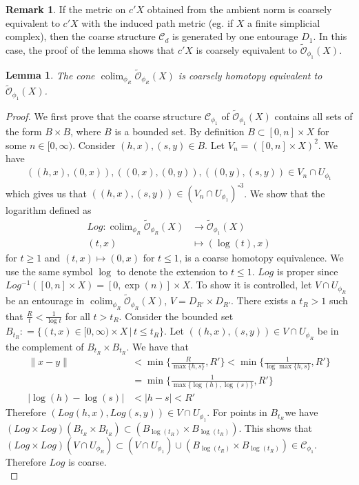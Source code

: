\documentclass[a4paper,11pt]{article}
\theoremstyle{definition}
\newtheorem*{remark}{Remark}
\theoremstyle{plain}
\newtheorem{lemma}[definition]{Lemma}
\theoremstyle{remark}
\DeclareMathOperator{\colim}{colim}
\begin{document}
\begin{remark} If the metric on $c'X$ obtained from the ambient norm is coarsely equivalent to $c'X$ with the induced path metric (eg. if $X$ a finite simplicial complex), then the coarse structure $\mathcal{C}_{d}$ is generated by one entourage $D_{1}$. In this case, the proof of the lemma shows that $c'X$ is coarsely equivalent to $\tilde{\mathcal{O}}_{\phi_1}(X)$. 
\end{remark}


\begin{lemma} The cone $\colim_{\phi_{R}}\tilde{\mathcal{O}}_{\phi_{R}}(X)$  is coarsely homotopy equivalent to $\tilde{\mathcal{O}}_{\phi_1}(X)$.  
\end{lemma}

\begin{proof}We first prove that the coarse structure $\mathcal{C}_{\phi_1}$ of $\tilde{\mathcal{O}}_{\phi_1}(X)$ contains all sets of the form $B \times B$, where $B$ is a bounded set. By definition $B\subset [0,n] \times X$ for some $n\in [0,\infty)$. Consider $(h,x),(s,y)\in B$. Let $V_{n} = ([0,n] \times X)^2$. We have 
\begin{align*}
((h,x),(0,x)), ((0,x), (0,y)), ((0,y),(s,y)) \in V_{n} \cap U_{\phi_1}
\end{align*}  
which gives us that $((h,x),(s,y))\in (V_{n} \cap U_{\phi_1})^{\circ 3}$. We show that the logarithm defined as 
\begin{align*}
Log:  \colim_{\phi_{R}}\tilde{\mathcal{O}}_{\phi_{R}}(X) &\rightarrow  \tilde{\mathcal{O}}_{\phi_1}(X)\\
(t,x) &\mapsto (\log (t), x)
\end{align*}
for $t\geq 1$ and $(t,x)\mapsto (0,x)$ for $t\leq 1$, is a coarse homotopy equivalence. We use the same symbol $\log$ to denote the extension to $t\leq 1$. $Log$ is proper since $Log^{-1}([0,n]\times X) = [0,\exp(n)] \times X$. To show it is controlled, let $V\cap U_{\phi_{R}}$ be an entourage in $ \colim_{\phi_{R}}\tilde{\mathcal{O}}_{\phi_{R}}(X)$, $V=D_{R'}\times D_{R'}$. There exists a $t_{R}>1$ such that $\frac{R}{t}<\frac{1}{\log t}$ for all $t> t_R$. Consider the bounded set $B_{t_R}: = \{(t,x) \in [0,\infty) \times X\,|\, t\leq t_R\}$. Let $((h,x),(s,y)) \in V\cap U_{\phi_{R}}$ be in the complement of $B_{t_R} \times B_{t_{R}}$. We have that
\begin{align*}
\|x-y\| &< \min\{\frac{R}{\max\{h,s\}},R'\} < \min\{\frac{1}{\log{\max\{h,s\}}},R'\}\\
&=\min\{\frac{1}{\max\{\log(h),\log(s)\}},R'\}\\
|\log(h)-\log(s)|&< |h-s|<R'
\end{align*}
Therefore $(Log(h,x),Log(s,y))\in V\cap U_{\phi_1}$. For points in $B_{t_{R}}$we have $(Log \times Log) (B_{t_{R}}\times B_{t_{R}})\subset  (B_{\log(t_{R})}\times B_{\log(t_{R})})$. This shows that $(Log \times Log)(V\cap U_{\phi_{R}})\subset (V\cap U_{\phi_1})\cup (B_{\log(t_{R})}\times B_{\log(t_{R})})\in \mathcal{C}_{\phi_{1}}$. Therefore $Log$ is coarse. \\


\end{proof}
\end{document}

